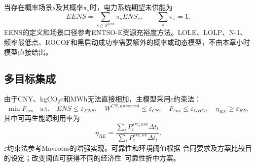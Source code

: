 当存在概率场景$s$及其概率$\pi_s$时，电力系统期望未供能为
\begin{equation}
EENS=\sum_{s\in\mathcal S^{scen}}\pi_sENS_s,
\qquad \sum_s\pi_s=1.
\label{eq:eens}
\end{equation}
EENS的定义和场景口径参考ENTSO-E资源充裕度方法\cite{entsoe-maf}。LOLE、LOLP、N-1、
频率最低点、ROCOF和黑启动成功率需要额外的概率或动态模型，不由本章小时模型直接给出。

\subsection{多目标集成}

由于CNY、kgCO$_2$e和MWh无法直接相加，主模型采用$\varepsilon$约束法：
\begin{equation}
\min F_{eco}
\quad\mathrm{s.t.}\quad
ENS\le\varepsilon_{ENS},\quad
W^{CS,unserved}\le\varepsilon_{CS},\quad
F_{env}\le\varepsilon_{GHG},\quad
\eta_{RE}\ge\varepsilon_{RE},
\label{eq:epsilon-constraint}
\end{equation}
其中可再生能源利用率为
\begin{equation}
\eta_{RE}=\frac{\sum_tP_t^{src,use}\Delta t_t}
{\sum_tP_t^{src,av}\Delta t_t}.
\label{eq:renewable-utilization}
\end{equation}
$\varepsilon$约束法参考Mavrotas的增强实现\cite{mavrotas2009}。可靠性和环境阈值根据
合同要求及方案比较目的设定；改变阈值可获得不同的经济性--可靠性折中方案。
